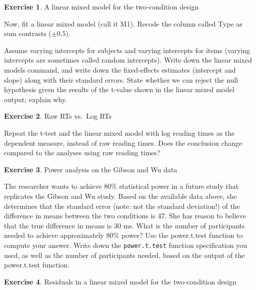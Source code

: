 \documentclass[
  12pt,
]{krantz}
\theoremstyle{definition}
\theoremstyle{definition}
\theoremstyle{definition}
\newtheorem{exercise}{Exercise}[chapter]
\theoremstyle{definition}
\theoremstyle{remark}
\begin{document}
\begin{exercise}
\protect\hypertarget{exr:LMMGibsonWu}{}\label{exr:LMMGibsonWu}A linear mixed model for the two-condition design
\end{exercise}

Now, fit a linear mixed model (call it M1). Recode the column called Type as sum contrasts (\(\pm 0.5\)).

Assume varying intercepts for subjects and varying intercepts for items (varying intercepts are sometimes called random intercepts). Write down the linear mixed models command, and write down the fixed-effects estimates (intercept and slope) along with their standard errors. State whether we can reject the null hypothesis given the results of the t-value shown in the linear mixed model output; explain why.

\begin{exercise}
\protect\hypertarget{exr:LMMGibsonWuLogRT}{}\label{exr:LMMGibsonWuLogRT}Raw RTs vs.~Log RTs
\end{exercise}

Repeat the t-test and the linear mixed model with log reading times as the dependent measure, instead of raw reading times. Does the conclusion change compared to the analyses using raw reading times?

\begin{exercise}
\protect\hypertarget{exr:LMMGibsonWuPower}{}\label{exr:LMMGibsonWuPower}Power analysis on the Gibson and Wu data
\end{exercise}

The researcher wants to achieve 80\% statistical power in a future study that replicates the Gibson and Wu study. Based on the available data above, she determines that the standard error (note: not the standard deviation!) of the difference in means between the two conditions is 47. She has reason to believe that the true difference in means is \(30\) ms. What is the number of participants needed to achieve approximately 80\% power? Use the power.t.test function to compute your answer. Write down the \texttt{power.t.test} function specification you used, as well as the number of participants needed, based on the output of the power.t.test function.

\begin{exercise}
\protect\hypertarget{exr:LMMGibsonWuresiduals}{}\label{exr:LMMGibsonWuresiduals}Residuals in a linear mixed model for the two-condition design
\end{exercise}
\end{document}
